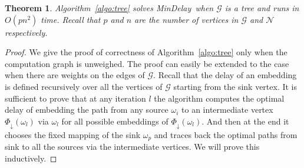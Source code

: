 \documentclass[journal]{IEEEtran}
\newtheorem{theorem}{{\bf Theorem}}
\newcommand{\net}{\mathcal{N}}
\newcommand{\compgraph}{\mathcal{G}}
\newcommand{\sucnodes}[1]{\Phi_{\downarrow}(#1)}
\newcommand{\mindelay}{\textsf{MinDelay}}
\begin{document}
\begin{theorem}
  \label{thm:mindelay_tree}
  Algorithm~\ref{algo:tree} solves \mindelay\ when $\compgraph$ is a
  tree and runs in $O(pn^2)$ time. Recall that $p$ and $n$ are the
  number of vertices in $\compgraph$ and $\net$ respectively.
\end{theorem}

\begin{proof}
  We give the proof of correctness of Algorithm~\ref{algo:tree} only
  when the computation graph is unweighed. The proof can easily be
  extended to the case when there are weights on the edges of
  $\compgraph.$ Recall that the delay of an embedding is defined
  recursively over all the vertices of $\compgraph$ starting from the
  sink vertex. It is sufficient to prove that at any iteration $l$ the
  algorithm computes the optimal delay of embedding the path from any
  source $\omega_i$ to an intermediate vertex $\sucnodes{\omega_l}$
  via $\omega_l$ for all possible embeddings of $\sucnodes{\omega_l}.$
  And then at the end it chooses the fixed mapping of the sink
  $\omega_p$ and traces back the optimal paths from sink to all the
  sources via the intermediate vertices. We will prove this
  inductively.


\end{proof}
\end{document}
